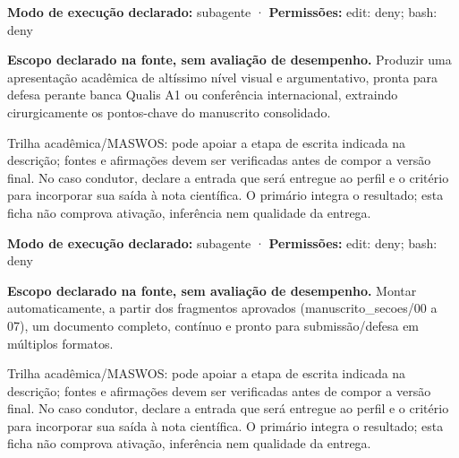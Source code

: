 \begin{arquitetura}
\textbf{Modo de execução declarado:} subagente · \textbf{Permissões:} edit: deny; bash: deny
\end{arquitetura}


\begin{descricao}
\textbf{Escopo declarado na fonte, sem avaliação de desempenho.}
Produzir uma apresentação acadêmica de altíssimo nível visual e argumentativo, pronta para defesa perante banca Qualis A1 ou conferência internacional, extraindo cirurgicamente os pontos-chave do manuscrito consolidado.
\end{descricao}

\begin{funcao}
Trilha acadêmica/MASWOS: pode apoiar a etapa de escrita indicada na descrição; fontes e afirmações devem ser verificadas antes de compor a versão final. No caso condutor, declare a entrada que será entregue ao perfil e o critério para incorporar sua saída à nota científica. O primário integra o resultado; esta ficha não comprova ativação, inferência nem qualidade da entrega.
\end{funcao}

\begin{arquitetura}
\textbf{Modo de execução declarado:} subagente · \textbf{Permissões:} edit: deny; bash: deny
\end{arquitetura}


\begin{descricao}
\textbf{Escopo declarado na fonte, sem avaliação de desempenho.}
Montar automaticamente, a partir dos fragmentos aprovados (manuscrito\_secoes/00 a 07), um documento completo, contínuo e pronto para submissão/defesa em múltiplos formatos.
\end{descricao}

\begin{funcao}
Trilha acadêmica/MASWOS: pode apoiar a etapa de escrita indicada na descrição; fontes e afirmações devem ser verificadas antes de compor a versão final. No caso condutor, declare a entrada que será entregue ao perfil e o critério para incorporar sua saída à nota científica. O primário integra o resultado; esta ficha não comprova ativação, inferência nem qualidade da entrega.
\end{funcao}

